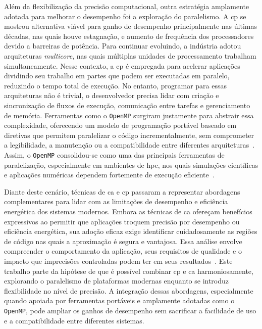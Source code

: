 Além da flexibilização da precisão computacional, outra estratégia amplamente adotada para melhorar o desempenho foi a exploração do paralelismo. A \gls{cp} se mostrou alternativa viável para ganho de desempenho principalmente nas últimas décadas, nas quais houve estagnação, e aumento de frequência dos processadores devido a barreiras de potência. Para continuar evoluindo, a indústria adotou arquiteturas \textit{multicore}, nas quais múltiplas unidades de processamento trabalham simultaneamente. Nesse contexto, a \gls{cp} é empregada para acelerar aplicações dividindo seu trabalho em partes que podem ser executadas em paralelo, reduzindo o tempo total de execução. No entanto, programar para essas arquiteturas não é trivial, o desenvolvedor precisa lidar com criação e sincronização de fluxos de execução, comunicação entre tarefas e gerenciamento de memória. Ferramentas como o \texttt{OpenMP} surgiram justamente para abstrair essa complexidade, oferecendo um modelo de programação portável baseado em diretivas que permitem paralelizar o código incrementalmente, sem comprometer a legibilidade, a manutenção ou a compatibilidade entre diferentes arquiteturas~\cite{goncalves2016, alrawais2021}. Assim, o \texttt{OpenMP} consolidou-se como uma das principais ferramentas de paralelização, especialmente em ambientes de \gls{hpc}, nos quais simulações científicas e aplicações numéricas dependem fortemente de execução eficiente~\cite{adhikari2012}.

Diante deste cenário, técnicas de \gls{ca} e \gls{cp} passaram a representar abordagens complementares para lidar com as limitações de desempenho e eficiência energética dos sistemas modernos. Embora as técnicas de \gls{ca} ofereçam benefícios expressivos ao permitir que aplicações troquem precisão por desempenho ou eficiência energética, sua adoção eficaz exige identificar cuidadosamente as regiões de código nas quais a aproximação é segura e vantajosa. Essa análise envolve compreender o comportamento da aplicação, seus requisitos de qualidade e o impacto que imprecisões controladas podem ter em seus resultados~\cite{sampson2015, reis2021}. Este trabalho parte da hipótese de que é possível combinar \gls{cp} e \gls{ca} harmoniosamente, explorando o paralelismo de plataformas modernas enquanto se introduz flexibilidade no nível de precisão. A integração dessas abordagens, especialmente quando apoiada por ferramentas portáveis e amplamente adotadas como o \texttt{OpenMP}, pode ampliar os ganhos de desempenho sem sacrificar a facilidade de uso e a compatibilidade entre diferentes sistemas.

